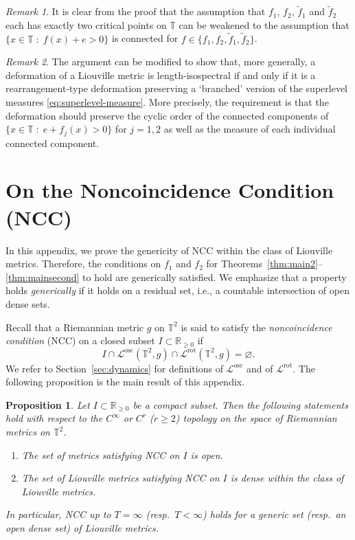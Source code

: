 \documentclass[11pt,letterpaper,oneside]{amsart}
\newcommand{\R}{\mathbb{R}}
\newcommand{\T}{\mathbb{T}}
\newtheorem{prop}[theo]{Proposition}
\theoremstyle{definition}
\theoremstyle{remark}
\newcommand{\wt}{\widetilde}
\theoremstyle{definition}
\theoremstyle{remark}
\newtheorem*{remark}{Remark}
\newcommand{\CL}{\mathcal{L}}
\DeclareMathOperator{\rot}{rot}
\DeclareMathOperator{\osc}{osc}
\begin{document}
\begin{remark}
	It is clear from the proof that the assumption that $f_1$, $f_2$, $\wt f_1$ and $\wt f_2$ each has exactly two critical points on $\T$ can be weakened to  the assumption that $\{x \in \T \; : \; f(x) + e > 0\}$ is connected for $f \in \{f_1, f_2, \wt f_1, \wt f_2\}$.
\end{remark}

\begin{remark}
	The argument can be modified to show that, more generally, a deformation of a Liouville metric is length-isospectral if and only if it is a rearrangement-type deformation preserving a `branched' version of the superlevel measures \eqref{eq:superlevel-measure}.
	More precisely, the requirement is that  the deformation should preserve the cyclic order of the connected components of $\{x \in \T \; : \; e + f_j(x) > 0\}$ for $j = 1,2$ as well as the measure of each individual connected component.
\end{remark}



\appendix

\section{On the Noncoincidence Condition (NCC)} \label{app:NCC}


In this appendix, we prove the genericity of NCC within the class of Liouville metrics.
Therefore, the conditions on $f_1$ and $f_2$ for Theorems~\ref{thm:main2}--\ref{thm:mainsecond} to hold are generically satisfied.
We emphasize that a property holds \emph{generically} if it holds on a residual set, i.e., a countable intersection of open dense sets.

\medskip

Recall that a Riemannian metric $g$ on $\T^2$ is said to satisfy the \emph{noncoincidence condition} (NCC) on a closed subset $I \subset \R_{\geq 0}$ if
\begin{equation*}
    I \cap \CL^{\osc}(\T^2, g) \cap \CL^{\rot}(\T^2, g) = \varnothing.
\end{equation*}
We refer to Section~\ref{sec:dynamics} for definitions of $\CL^{\osc}$ and of $\CL^{\rot}$.
The following proposition is the main result of this appendix.

\begin{prop}\label{prop:NCC gen}
    Let $I \subset \R_{\geq 0}$ be a \emph{compact} subset.
    Then the following statements hold with respect to the $C^\infty$ or $C^r$ ($r \geq 2$) topology on the space of Riemannian metrics on $\T^2$.
    \begin{enumerate}
        \item The set of metrics satisfying NCC on $I$ is open.
        \item The set of Liouville metrics satisfying NCC on $I$ is dense within the class of Liouville metrics.
    \end{enumerate}
    In particular, NCC up to $T=\infty$ (resp.\ $T<\infty$) holds for a generic set (resp.\ an open dense set) of Liouville metrics.
\end{prop}
\end{document}
